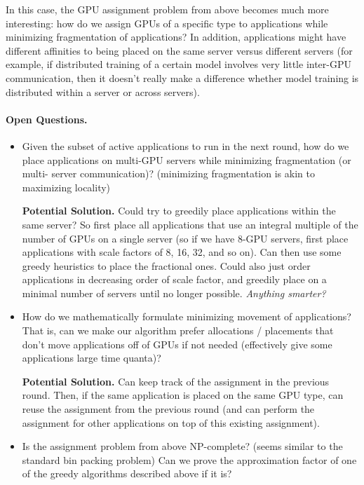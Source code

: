 \documentclass{article}
\begin{document}
In this case, the GPU assignment problem from above becomes much more interesting:
how do we assign GPUs of a specific type to applications while minimizing
fragmentation of applications? In addition, applications might have different
affinities to being placed on the same server versus different servers (for example,
if distributed training of a certain model involves very little inter-GPU
communication, then it doesn't really make a difference whether model training
is distributed within a server or across servers).

\paragraph{Open Questions.}

\begin{itemize}
\item Given the subset of active applications to run in the next round, how do we
place applications on multi-GPU servers while minimizing fragmentation (or multi-
server communication)? (minimizing fragmentation is akin to maximizing locality)

\textbf{Potential Solution.} Could try to greedily place applications within the
same server? So first place all applications that use an integral multiple of
the number of GPUs on a single server (so if we have 8-GPU servers, first place
applications with scale factors of 8, 16, 32, and so on). Can then use some
greedy heuristics to place the fractional ones. Could also just order applications
in decreasing order of scale factor, and greedily place on a minimal number of
servers until no longer possible. \textit{Anything smarter?}

\item How do we mathematically formulate minimizing movement of applications?
That is, can we make our algorithm prefer allocations / placements that don't
move applications off of GPUs if not needed (effectively give some applications
large time quanta)?

\textbf{Potential Solution.} Can keep track of the assignment in the previous round. Then, if
the same application is placed on the same GPU type, can reuse the assignment from
the previous round (and can perform the assignment for other applications on top
of this existing assignment).

\item Is the assignment problem from above NP-complete? (seems similar to the
standard bin packing problem) Can we prove the approximation factor of one of
the greedy algorithms described above if it is?


\end{itemize}
\end{document}
